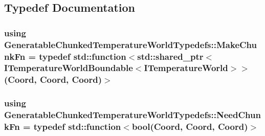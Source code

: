 \subsection{Typedef Documentation}
\hypertarget{namespace_generatable_chunked_temperature_world_typedefs_a719e4469a105a21a76ed22274639c03a}{
\subsubsection[{Make\-Chunk\-Fn}]{\setlength{\rightskip}{0pt plus 5cm}using {\bf Generatable\-Chunked\-Temperature\-World\-Typedefs\-::\-Make\-Chunk\-Fn} = typedef std\-::function$<$std\-::shared\-\_\-ptr$<${\bf I\-Temperature\-World\-Boundable}$<${\bf I\-Temperature\-World}$>$$>$({\bf Coord}, {\bf Coord}, {\bf Coord})$>$}}\label{namespace_generatable_chunked_temperature_world_typedefs_a719e4469a105a21a76ed22274639c03a}
\hypertarget{namespace_generatable_chunked_temperature_world_typedefs_a07d38658571f8f09839bc1bc8b105107}{
\subsubsection[{Need\-Chunk\-Fn}]{\setlength{\rightskip}{0pt plus 5cm}using {\bf Generatable\-Chunked\-Temperature\-World\-Typedefs\-::\-Need\-Chunk\-Fn} = typedef std\-::function$<$bool({\bf Coord}, {\bf Coord}, {\bf Coord})$>$}}\label{namespace_generatable_chunked_temperature_world_typedefs_a07d38658571f8f09839bc1bc8b105107}
